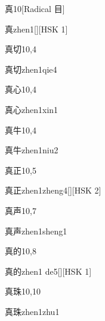 \begin{entry}{真}{10}[Radical 目]
  \begin{phonetics}{真}{zhen1}[][HSK 1]
  \end{phonetics}
\end{entry}

\begin{entry}{真切}{10,4}
  \begin{phonetics}{真切}{zhen1qie4}
  \end{phonetics}
\end{entry}

\begin{entry}{真心}{10,4}
  \begin{phonetics}{真心}{zhen1xin1}
  \end{phonetics}
\end{entry}

\begin{entry}{真牛}{10,4}
  \begin{phonetics}{真牛}{zhen1niu2}
  \end{phonetics}
\end{entry}

\begin{entry}{真正}{10,5}
  \begin{phonetics}{真正}{zhen1zheng4}[][HSK 2]
  \end{phonetics}
\end{entry}

\begin{entry}{真声}{10,7}
  \begin{phonetics}{真声}{zhen1sheng1}
  \end{phonetics}
\end{entry}

\begin{entry}{真的}{10,8}
  \begin{phonetics}{真的}{zhen1 de5}[][HSK 1]
  \end{phonetics}
\end{entry}

\begin{entry}{真珠}{10,10}
  \begin{phonetics}{真珠}{zhen1zhu1}
  \end{phonetics}
\end{entry}

